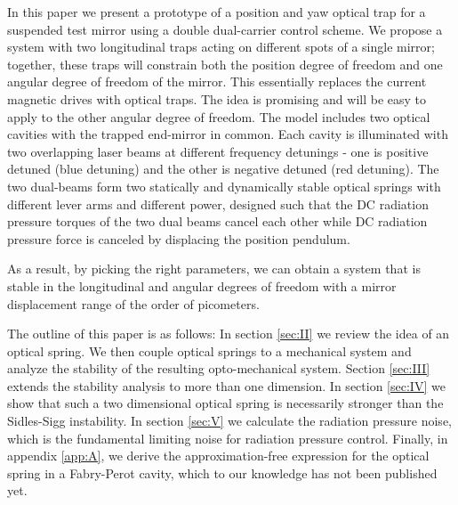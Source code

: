 In this paper we present
a prototype of a position and yaw optical trap for a suspended test mirror using a double dual-carrier control 
scheme. 
We propose a system with two longitudinal traps acting on different spots of a single mirror; together, these traps will constrain both the position degree of freedom and one angular degree of freedom of the mirror.
This essentially replaces the current magnetic drives with optical traps.  The idea is promising and will be easy to apply to the other
angular degree of freedom.
The model includes two optical cavities with the trapped end-mirror in common. Each cavity is illuminated with two overlapping laser beams at different frequency detunings - one is positive detuned (blue detuning) and the other is negative detuned (red detuning).
The two dual-beams form two statically and dynamically stable optical springs with different lever arms and different power, designed such that the DC radiation pressure torques of the two dual beams cancel each other while 
DC radiation pressure force is canceled by displacing the position pendulum.

As a result, by picking the right 
parameters, we can obtain a system that is stable in the longitudinal and angular degrees of freedom with a mirror 
displacement range of the order of picometers.

The outline of this paper is as follows: In section \ref{sec:II} we review the idea of an optical spring. We then couple optical springs to a mechanical system and analyze the stability of the resulting opto-mechanical system.
Section \ref{sec:III} extends the stability analysis to more than one dimension.
In section \ref{sec:IV} we show that such a two dimensional optical spring is necessarily stronger than the Sidles-Sigg instability. In section \ref{sec:V} we calculate the radiation pressure noise, which is the fundamental limiting noise for radiation pressure control. Finally, in appendix \ref{app:A}, we derive the approximation-free expression for the optical spring in a Fabry-Perot cavity, which to our knowledge has not been published yet.

